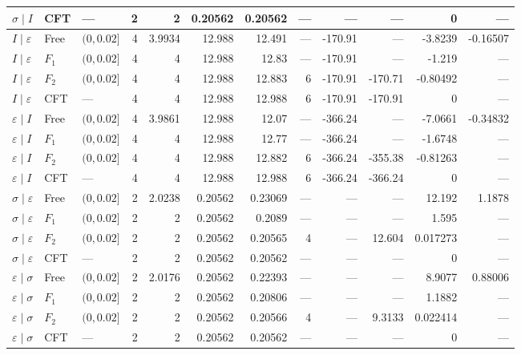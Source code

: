 \begin{longtable}{lllrrrrrrrrr}
$\sigma\mid I$ & CFT & --- & 2 & 2 & 0.20562 & 0.20562 & --- & --- & --- & 0 & ---\\
\midrule
$I\mid \varepsilon$ & Free & $(0,0.02]$ & 4 & 3.9934 & 12.988 & 12.491 & --- & -170.91 & --- & -3.8239 & -0.16507\\*
$I\mid \varepsilon$ & $F_1$ & $(0,0.02]$ & 4 & 4 & 12.988 & 12.83 & --- & -170.91 & --- & -1.219 & ---\\*
$I\mid \varepsilon$ & $F_2$ & $(0,0.02]$ & 4 & 4 & 12.988 & 12.883 & 6 & -170.91 & -170.71 & -0.80492 & ---\\*
$I\mid \varepsilon$ & CFT & --- & 4 & 4 & 12.988 & 12.988 & 6 & -170.91 & -170.91 & 0 & ---\\
\midrule
$\varepsilon\mid I$ & Free & $(0,0.02]$ & 4 & 3.9861 & 12.988 & 12.07 & --- & -366.24 & --- & -7.0661 & -0.34832\\*
$\varepsilon\mid I$ & $F_1$ & $(0,0.02]$ & 4 & 4 & 12.988 & 12.77 & --- & -366.24 & --- & -1.6748 & ---\\*
$\varepsilon\mid I$ & $F_2$ & $(0,0.02]$ & 4 & 4 & 12.988 & 12.882 & 6 & -366.24 & -355.38 & -0.81263 & ---\\*
$\varepsilon\mid I$ & CFT & --- & 4 & 4 & 12.988 & 12.988 & 6 & -366.24 & -366.24 & 0 & ---\\
\midrule
$\sigma\mid \varepsilon$ & Free & $(0,0.02]$ & 2 & 2.0238 & 0.20562 & 0.23069 & --- & --- & --- & 12.192 & 1.1878\\*
$\sigma\mid \varepsilon$ & $F_1$ & $(0,0.02]$ & 2 & 2 & 0.20562 & 0.2089 & --- & --- & --- & 1.595 & ---\\*
$\sigma\mid \varepsilon$ & $F_2$ & $(0,0.02]$ & 2 & 2 & 0.20562 & 0.20565 & 4 & --- & 12.604 & 0.017273 & ---\\*
$\sigma\mid \varepsilon$ & CFT & --- & 2 & 2 & 0.20562 & 0.20562 & --- & --- & --- & 0 & ---\\
\midrule
$\varepsilon\mid \sigma$ & Free & $(0,0.02]$ & 2 & 2.0176 & 0.20562 & 0.22393 & --- & --- & --- & 8.9077 & 0.88006\\*
$\varepsilon\mid \sigma$ & $F_1$ & $(0,0.02]$ & 2 & 2 & 0.20562 & 0.20806 & --- & --- & --- & 1.1882 & ---\\*
$\varepsilon\mid \sigma$ & $F_2$ & $(0,0.02]$ & 2 & 2 & 0.20562 & 0.20566 & 4 & --- & 9.3133 & 0.022414 & ---\\*
$\varepsilon\mid \sigma$ & CFT & --- & 2 & 2 & 0.20562 & 0.20562 & --- & --- & --- & 0 & ---\\
\end{longtable}
\endgroup
